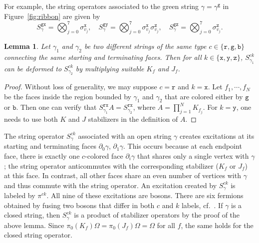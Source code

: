 \documentclass[a4paper,11pt]{article}
\newtheorem{lemma}[theorem]{Lemma}
\theoremstyle{definition}
\theoremstyle{remark}
\theoremstyle{remark}
\begin{document}
For example, the string operators associated to the green string $\gamma=\gamma^{\mathtt{g}}$ in Figure~\ref{fig:ribbon} are given by 
\begin{equation*}
    S_{\gamma}^{\mathtt{g}\mathtt{x}} = \bigotimes_{j=0}^7 \sigma_{v_j}^{\mathtt{x}}, \quad S_{\gamma}^{\mathtt{g}\mathtt{y}} = \bigotimes_{j=0}^7 \sigma_{v_j}^{\mathtt{x}}\sigma_{v_j}^{\mathtt{z}}, \quad S_{\gamma}^{\mathtt{g}\mathtt{z}} = \bigotimes_{j=0}^7 \sigma_{v_j}^{\mathtt{z}}.  
\end{equation*}

\begin{lemma}\label{lem:defom}
    Let $\gamma_1$ and $\gamma_2$ be two different strings of the same type $c\in \{\mathtt{r},\mathtt{g},\mathtt{b}\}$ connecting the same starting and terminating faces. Then for all $k\in\{\mathtt{x},\mathtt{y},\mathtt{z}\}$, $S_{\gamma_1}^{ck}$ can be deformed to $S_{\gamma_2}^{ck}$ by multiplying suitable $K_f$ and $J_f$. 
\end{lemma}

\begin{proof}
    Without loss of generality, we may suppose $c=\mathtt{r}$ and $k=\mathtt{x}$. 
    Let $f_1,\cdots,f_N$ be the faces inside the region bounded by $\gamma_1$ and $\gamma_2$ that are colored either by $\mathtt{g}$ or $\mathtt{b}$. Then one can verify that $S_{\gamma_1}^{\mathtt{r}\mathtt{x}}A = S_{\gamma_2}^{\mathtt{r}\mathtt{x}}$, where $A = \prod_{j=1}^N K_{f_j}$. 
    For $k=\mathtt{y}$, one needs to use both $K$ and $J$ stabilizers in the definition of $A$. 
\end{proof}

The string operator $S_\gamma^{ck}$ associated with an open string $\gamma$ creates excitations at its starting and terminating faces $\partial_0\gamma$, $\partial_1\gamma$. 
This occurs because at each endpoint face, there is exactly one $c$-colored face $\partial_i\gamma$ that shares only a single vertex with $\gamma$; the string operator anticommutes with the corresponding stabilizer ($K_f$ or $J_f$) at this face. 
In contrast, all other faces share an even number of vertices with $\gamma$ and thus commute with the string operator.
An excitation created by $S_\gamma^{ck}$ is labeled by $\pi^{ck}$. All nine of these excitations are bosons. There are six fermions obtained by fusing two bosons that differ in both $c$ and $k$ labels, cf.~\cite{kesselring2024anyon}.  
If $\gamma$ is a closed string, then $S_{\gamma}^{ck}$ is a product of stabilizer operators by the proof of the above lemma.
Since $\pi_0(K_f)\Omega = \pi_0(J_f)\Omega = \Omega$ for all $f$, the same holds for the closed string operator.
\end{document}
